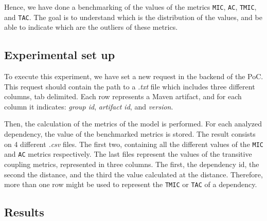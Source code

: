 Hence, we have done a benchmarking of the values of the metrics \texttt{MIC}, \texttt{AC}, \texttt{TMIC}, and \texttt{TAC}. The goal is to understand which is the distribution of the values, and be able to indicate which are the outliers of these metrics.

\subsection{Experimental set up}
To execute this experiment, we have set a new request in the backend of the PoC. This request should contain the path to a \textit{.txt} file which includes three different columns, tab delimited. Each row represents a Maven artifact, and for each column it indicates: \textit{group id}, \textit{artifact id}, and \textit{version}.

Then, the calculation of the metrics of the model is performed. For each analyzed dependency, the value of the benchmarked metrics is stored. The result consists on 4 different \textit{.csv} files. The first two, containing all the different values of the \texttt{MIC} and \texttt{AC} metrics respectively. The last files represent the values of the transitive coupling metrics, represented in three columns. The first, the dependency id, the second the distance, and the third the value calculated at the distance. Therefore, more than one row might be used to represent the \texttt{TMIC} or \texttt{TAC} of a dependency.

\subsection{Results}
